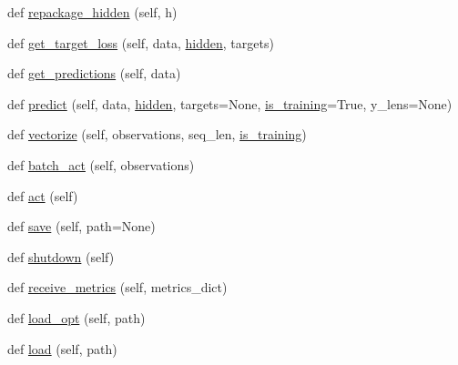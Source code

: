 \begin{DoxyCompactItemize}
def \hyperlink{classparlai_1_1agents_1_1language__model_1_1language__model_1_1LanguageModelAgent_aa54ff09a8edc6ae51ac8be33aeb4acc8}{repackage\+\_\+hidden} (self, h)
\item 
def \hyperlink{classparlai_1_1agents_1_1language__model_1_1language__model_1_1LanguageModelAgent_aeb1136a4ae2a2a1e8c0d5a7b75d9898f}{get\+\_\+target\+\_\+loss} (self, data, \hyperlink{classparlai_1_1agents_1_1language__model_1_1language__model_1_1LanguageModelAgent_aa7c4053a69871ded8ac7f6afc31b9af3}{hidden}, targets)
\item 
def \hyperlink{classparlai_1_1agents_1_1language__model_1_1language__model_1_1LanguageModelAgent_aa3de87163cd61e4195afc0ccf801699b}{get\+\_\+predictions} (self, data)
\item 
def \hyperlink{classparlai_1_1agents_1_1language__model_1_1language__model_1_1LanguageModelAgent_a1ff4e6849d50eb9d58a2f97a91d715ce}{predict} (self, data, \hyperlink{classparlai_1_1agents_1_1language__model_1_1language__model_1_1LanguageModelAgent_aa7c4053a69871ded8ac7f6afc31b9af3}{hidden}, targets=None, \hyperlink{classparlai_1_1agents_1_1language__model_1_1language__model_1_1LanguageModelAgent_ae4a04c916f52bdd6d5163d36d49aa378}{is\+\_\+training}=True, y\+\_\+lens=None)
\item 
def \hyperlink{classparlai_1_1agents_1_1language__model_1_1language__model_1_1LanguageModelAgent_aeddf3a4b207e0668644ce6dfd93f39ef}{vectorize} (self, observations, seq\+\_\+len, \hyperlink{classparlai_1_1agents_1_1language__model_1_1language__model_1_1LanguageModelAgent_ae4a04c916f52bdd6d5163d36d49aa378}{is\+\_\+training})
\item 
def \hyperlink{classparlai_1_1agents_1_1language__model_1_1language__model_1_1LanguageModelAgent_a91a1386cee7fa786aa817a58646cda5e}{batch\+\_\+act} (self, observations)
\item 
def \hyperlink{classparlai_1_1agents_1_1language__model_1_1language__model_1_1LanguageModelAgent_a0f8d50e5423b4f34ab5d078d6185e4b2}{act} (self)
\item 
def \hyperlink{classparlai_1_1agents_1_1language__model_1_1language__model_1_1LanguageModelAgent_adc621ff0e625e2f00225d78408e9bafc}{save} (self, path=None)
\item 
def \hyperlink{classparlai_1_1agents_1_1language__model_1_1language__model_1_1LanguageModelAgent_ab7b37ff49b1ce04ef7ce0e598cf736e3}{shutdown} (self)
\item 
def \hyperlink{classparlai_1_1agents_1_1language__model_1_1language__model_1_1LanguageModelAgent_a058d0497a88662c2d523b3b5a836a0bb}{receive\+\_\+metrics} (self, metrics\+\_\+dict)
\item 
def \hyperlink{classparlai_1_1agents_1_1language__model_1_1language__model_1_1LanguageModelAgent_a8f879ddce0947b8b56f980f7f4fea07b}{load\+\_\+opt} (self, path)
\item 
def \hyperlink{classparlai_1_1agents_1_1language__model_1_1language__model_1_1LanguageModelAgent_a3b1a39e1467680e19dccfcfb8dae4273}{load} (self, path)
\end{DoxyCompactItemize}
